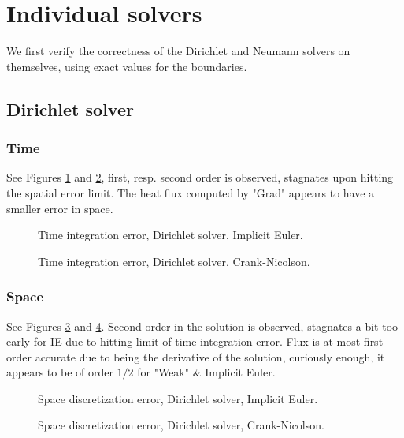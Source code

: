 \documentclass[a4paper,10pt]{article}
\begin{document}
\section{Individual solvers}
We first verify the correctness of the Dirichlet and Neumann solvers on themselves, using exact values for the boundaries.
% 
\FloatBarrier
\subsection{Dirichlet solver}
% 
\FloatBarrier
\subsubsection{Time}
See Figures \ref{FIG D TIME 1} and \ref{FIG D TIME 2}, first, resp. second order is observed, stagnates upon hitting the spatial error limit. The heat flux computed by "Grad" appears to have a smaller error in space.
% 
\begin{figure}[ht!]
\caption{Time integration error, Dirichlet solver, Implicit Euler.}
\label{FIG D TIME 1}
\end{figure}
% 
\begin{figure}[ht!]
\caption{Time integration error, Dirichlet solver, Crank-Nicolson.}
\label{FIG D TIME 2}
\end{figure}
% 
\FloatBarrier
\subsubsection{Space}
See Figures \ref{FIG D SPACE 1} and \ref{FIG D SPACE 2}. Second order in the solution is observed, stagnates a bit too early for IE due to hitting limit of time-integration error. Flux is at most first order accurate due to being the derivative of the solution, curiously enough, it appears to be of order $1/2$ for "Weak" \& Implicit Euler.
% 
\begin{figure}[ht!]
\caption{Space discretization error, Dirichlet solver, Implicit Euler.}
\label{FIG D SPACE 1}
\end{figure}
% 
\begin{figure}[ht!]
\caption{Space discretization error, Dirichlet solver, Crank-Nicolson.}
\label{FIG D SPACE 2}
\end{figure}
% 
\FloatBarrier
\end{document}
